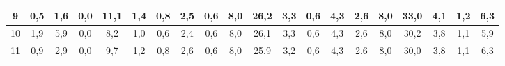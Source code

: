 \begin{sidewaystable}[]
\begin{tabular}{|c|c|c|c|c|c|c|c|c|c|c|c|c|c|c|c|c|c|c|c|}
    9  & 0,5                                             & 1,6                                             & 0,0                                             & 11,1                                             & 1,4                                              & 0,8                                              & 2,5                                              & 0,6                                              & 8,0                                              & 26,2                                             & 3,3                                              & 0,6                                              & 4,3                                              & 2,6                                              & 8,0                                              & 33,0                                             & 4,1                                              & 1,2                                              & 6,3                                              \\ \hline
    10 & 1,9                                             & 5,9                                             & 0,0                                             & 8,2                                              & 1,0                                              & 0,6                                              & 2,4                                              & 0,6                                              & 8,0                                              & 26,1                                             & 3,3                                              & 0,6                                              & 4,3                                              & 2,6                                              & 8,0                                              & 30,2                                             & 3,8                                              & 1,1                                              & 5,9                                              \\ \hline
    11 & 0,9                                             & 2,9                                             & 0,0                                             & 9,7                                              & 1,2                                              & 0,8                                              & 2,6                                              & 0,6                                              & 8,0                                              & 25,9                                             & 3,2                                              & 0,6                                              & 4,3                                              & 2,6                                              & 8,0                                              & 30,0                                             & 3,8                                              & 1,1                                              & 6,3                                              \\ \hline

\end{tabular}
\end{sidewaystable}
